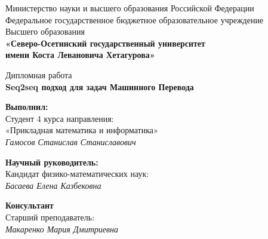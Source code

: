 \documentclass[a4paper,14pt]{article}
\begin{document}
	\setcounter{page}{0}
	
	\begin{center}
		\small{Министерство науки и высшего образования Российской Федерации}\\
		\small{Федеральное государственное бюджетное образовательное учреждение}\\
		\small{Высшего образования}\\
		\small{\textbf{«Северо-Осетинский государственный университет\\
				имени Коста Левановича Хетагурова»}}\\
		
		\hfill \break
		\hfill \break
		\hfill \break
		\hfill \break
		\hfill \break
		\hfill \break
		\hfill \break
		\hfill \break
		\hfill \break
		
		\normalsize{Дипломная работа}\\
		\large{\textbf{Seq2seq подход для задач Машинного Перевода}}\\
		
		\hfill \break
		\hfill \break
		\hfill \break
		\hfill \break
		\hfill \break
		\hfill\break
	\end{center}
	
	\begin{flushright}
		\textbf{Выполнил:}\\
		Студент 4 курса направления:\\
		«Прикладная математика и информатика»\\
		\textit{Гамосов Станислав Станиславович \underline{\hspace{3cm}}}\\
	\end{flushright}
	
	\hfill
	
	\begin{flushright}
		\textbf{Научный руководитель:}\\
		Кандидат физико-математических наук:\\
		\textit{Басаева Елена Казбековна \underline{\hspace{3cm}}}\\
	\end{flushright}
	
	\hfill
	
	\begin{flushright}
		\textbf{Консультант}\\
		Старший преподаватель: \\
		\textit{Макаренко Мария Дмитриевна \underline{\hspace{3cm}}}\\
	\end{flushright}
	
\end{document}
